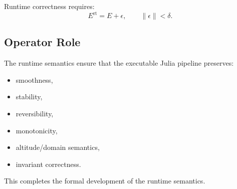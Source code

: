 Runtime correctness requires:
\[
E^{\text{rt}} = E + \epsilon,
\qquad
\| \epsilon \| < \delta.
\]

\subsection{Operator Role}

The runtime semantics ensure that the executable Julia pipeline preserves:

\begin{itemize}
    \item smoothness,
    \item stability,
    \item reversibility,
    \item monotonicity,
    \item altitude/domain semantics,
    \item invariant correctness.
\end{itemize}

This completes the formal development of the runtime semantics.
